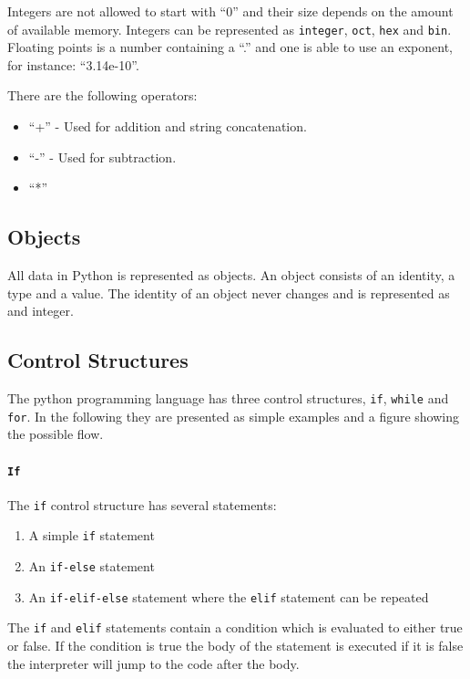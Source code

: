 Integers are not allowed to start with ``0'' and their size depends on the amount of available memory.
Integers can be represented as \texttt{integer}, \texttt{oct}, \texttt{hex} and \texttt{bin}.
Floating points is a number containing a ``.'' and one is able to use an exponent, for instance: ``3.14e-10''.

There are the following operators:
\begin{itemize}
\item ``+'' - Used for addition and string concatenation.
\item ``-'' - Used for subtraction.
\item ``*'' 
\end{itemize}

\subsection{Objects}
All data in Python is represented as objects.
An object consists of an identity, a type and a value.
The identity of an object never changes and is represented as and integer.

\subsection{Control Structures}\label{python:control_structures}
The python programming language has three control structures, \texttt{if}, \texttt{while} and \texttt{for}.
In the following they are presented as simple examples and a figure showing the possible flow.

\paragraph{\texttt{If}}
The \texttt{if} control structure has several statements:
\begin{enumerate}
\item A simple \texttt{if} statement
\item An \texttt{if-else} statement
\item An \texttt{if-elif-else} statement where the \texttt{elif} statement can be repeated
\end{enumerate}
The \texttt{if} and \texttt{elif} statements contain a condition which is evaluated to either true or false.
If the condition is true the body of the statement is executed if it is false the interpreter will jump to the code after the body.

